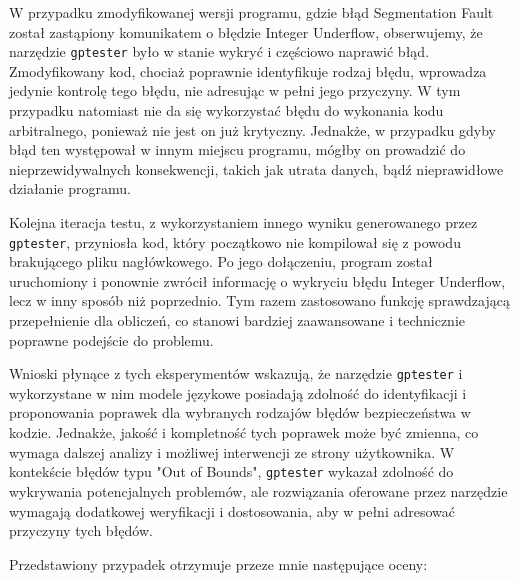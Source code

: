 W przypadku zmodyfikowanej wersji programu, gdzie błąd Segmentation Fault został zastąpiony komunikatem o błędzie Integer Underflow, obserwujemy, że narzędzie \texttt{gptester} było w stanie wykryć i częściowo naprawić błąd. Zmodyfikowany kod, chociaż poprawnie identyfikuje rodzaj błędu, wprowadza jedynie kontrolę tego błędu, nie adresując w pełni jego przyczyny. W tym przypadku natomiast nie da się wykorzystać błędu do wykonania kodu arbitralnego, ponieważ nie jest on już krytyczny. Jednakże, w przypadku gdyby błąd ten występował w innym miejscu programu, mógłby on prowadzić do nieprzewidywalnych konsekwencji, takich jak utrata danych, bądź nieprawidłowe działanie programu.

Kolejna iteracja testu, z wykorzystaniem innego wyniku generowanego przez \texttt{gptester}, przyniosła kod, który początkowo nie kompilował się z powodu brakującego pliku nagłówkowego. Po jego dołączeniu, program został uruchomiony i ponownie zwrócił informację o wykryciu błędu Integer Underflow, lecz w inny sposób niż poprzednio. Tym razem zastosowano funkcję sprawdzającą przepełnienie dla obliczeń, co stanowi bardziej zaawansowane i technicznie poprawne podejście do problemu.

Wnioski płynące z tych eksperymentów wskazują, że narzędzie \texttt{gptester} i wykorzystane w nim modele językowe posiadają zdolność do identyfikacji i proponowania poprawek dla wybranych rodzajów błędów bezpieczeństwa w kodzie. Jednakże, jakość i kompletność tych poprawek może być zmienna, co wymaga dalszej analizy i możliwej interwencji ze strony użytkownika. W kontekście błędów typu "Out of Bounds", \texttt{gptester} wykazał zdolność do wykrywania potencjalnych problemów, ale rozwiązania oferowane przez narzędzie wymagają dodatkowej weryfikacji i dostosowania, aby w pełni adresować przyczyny tych błędów. 

Przedstawiony przypadek otrzymuje przeze mnie następujące oceny:


